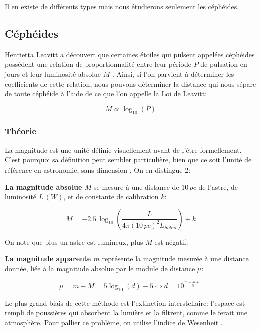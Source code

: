 \documentclass[12pt,a4paper,french]{scrartcl}
\begin{document}
Il en existe de différents types mais nous étudierons seulement les céphéides.

\subsection{Céphéides}
Henrietta Leavitt a découvert que certaines étoiles qui pulsent appelées céphéides possèdent une relation de proportionnalité 
entre leur période $P$ de pulsation en jours et leur luminosité absolue $M$ \citep{Leavitt1908_cepheid-origin}. 
Ainsi, si l'on parvient à déterminer les coefficients de cette relation, nous pouvons déterminer la distance qui nous sépare de toute céphéide
à l'aide de ce que l'on appelle la Loi de Leavitt:

\begin{equation}\label{eq.leavitt-law}
    M\propto \log_{10}(P)
\end{equation}

\subsubsection{Théorie}

La magnitude est une unité définie visuellement avant de l'être formellement. C'est pourquoi sa définition peut sembler particulière, 
bien que ce soit l'unité de référence en astronomie, sans dimension \citep[Chapitre~4.1]{book_bases}. On en distingue 2:

{\bfseries La magnitude absolue $M$} se mesure à une distance de $10\,pc$ de l'astre, de luminosité $L\,(W)$, et de constante de calibration $k$:

\begin{equation*}
    M=-2.5\,\log_{10}(\frac{L}{4\pi(10\,pc)^2L_{Soleil}})+k
\end{equation*}

On note que plus un astre est lumineux, plus $M$ est négatif.

{\bfseries La magnitude apparente $m$} représente la magnitude mesurée à une distance donnée, liée à la magnitude absolue par le module de distance $\mu$:

\begin{equation}\label{eq.module_distance}
    \mu = m-M = 5\log_{10}(d)-5 
    \Longleftrightarrow \boxed{d = 10^{\frac{m-M+5}{5}}}
\end{equation}

Le plus grand biais de cette méthode est l'extinction interstellaire: 
l'espace est rempli de poussières qui absorbent la lumière et la filtrent, comme le ferait une atmosphère.
Pour pallier ce problème, on utilise l'indice de Wesenheit \citep{Madore1982_Wesenheit}.
\end{document}
